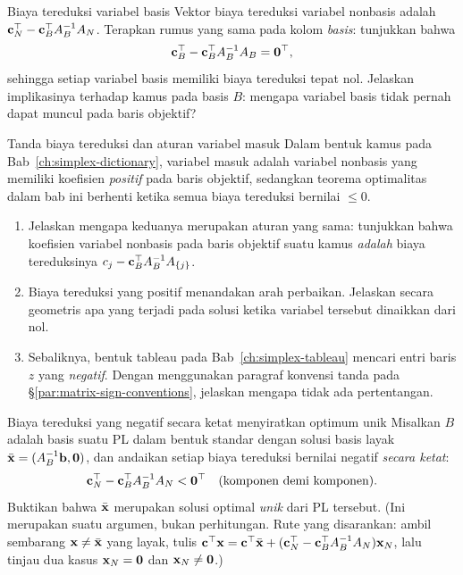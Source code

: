 
\begin{ex}{Biaya tereduksi variabel basis}{}
\label{ex:matrix-basic-reduced-zero}
 Vektor biaya tereduksi variabel nonbasis adalah \( \mathbf{c}_N^\top - \mathbf{c}_B^\top A_B^{-1} A_N \).  Terapkan rumus yang sama pada kolom \emph{basis}: tunjukkan bahwa
\[
\mathbf{c}_B^\top - \mathbf{c}_B^\top A_B^{-1} A_B = \mathbf{0}^\top,
\]
sehingga setiap variabel basis memiliki biaya tereduksi tepat nol.  Jelaskan implikasinya terhadap kamus pada basis \( B \): mengapa variabel basis tidak pernah dapat muncul pada baris objektif?
\exrefs{\S\ref{sec:optimality-conditions}}
\end{ex}

\begin{ex}{Tanda biaya tereduksi dan aturan variabel masuk}{}
\label{ex:matrix-sign-conventions}
 Dalam bentuk kamus pada Bab~\ref{ch:simplex-dictionary}, variabel masuk adalah variabel nonbasis yang memiliki koefisien \emph{positif} pada baris objektif, sedangkan teorema optimalitas dalam bab ini berhenti ketika semua biaya tereduksi bernilai \( \leq 0 \).
\begin{enumerate}
    \item Jelaskan mengapa keduanya merupakan aturan yang sama: tunjukkan bahwa koefisien variabel nonbasis pada baris objektif suatu kamus \emph{adalah} biaya tereduksinya \( c_j - \mathbf{c}_B^\top A_B^{-1} A_{\{j\}} \).
    \item Biaya tereduksi yang positif menandakan arah perbaikan.  Jelaskan secara geometris apa yang terjadi pada solusi ketika variabel tersebut dinaikkan dari nol.
    \item Sebaliknya, bentuk tableau pada Bab~\ref{ch:simplex-tableau} mencari entri baris \( z \) yang \emph{negatif}.  Dengan menggunakan paragraf konvensi tanda pada \S\ref{par:matrix-sign-conventions}, jelaskan mengapa tidak ada pertentangan.
\end{enumerate}
\end{ex}


\begin{ex}{Biaya tereduksi yang negatif secara ketat menyiratkan optimum unik}{}
\label{ex:matrix-unique-optimum}
 Misalkan \( B \) adalah basis suatu PL dalam bentuk standar dengan solusi basis layak \( \bar{\mathbf{x}} = (A_B^{-1}\mathbf{b}, \mathbf{0}) \), dan andaikan setiap biaya tereduksi bernilai negatif \emph{secara ketat}:
\[
\mathbf{c}_N^\top - \mathbf{c}_B^\top A_B^{-1} A_N < \mathbf{0}^\top \quad \mbox{(komponen demi komponen)}.
\]
Buktikan bahwa \( \bar{\mathbf{x}} \) merupakan solusi optimal \emph{unik} dari PL tersebut.  (Ini merupakan suatu argumen, bukan perhitungan.  Rute yang disarankan: ambil sembarang \( \mathbf{x} \neq \bar{\mathbf{x}} \) yang layak, tulis \( \mathbf{c}^\top \mathbf{x} = \mathbf{c}^\top \bar{\mathbf{x}} + (\mathbf{c}_N^\top - \mathbf{c}_B^\top A_B^{-1} A_N)\mathbf{x}_N \), lalu tinjau dua kasus \( \mathbf{x}_N = \mathbf{0} \) dan \( \mathbf{x}_N \neq \mathbf{0} \).)
\end{ex}

